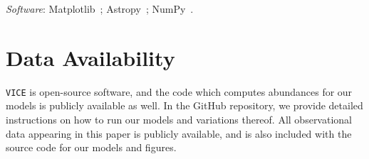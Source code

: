 \documentclass[fleqn, usenatbib]{mnras}
\begin{document}
\textit{Software}: Matplotlib~\citep{Matplotlib}; Astropy~\citep{Astropy2013, 
Astropy2018}; NumPy~\citep{NumPy}. 

\section{Data Availability} 
\label{sec:data_availability} 
\texttt{VICE} is open-source software, and the code which computes abundances 
for our models is publicly available as well. In the GitHub repository, we 
provide detailed instructions on how to run our models and variations thereof. 
All observational data appearing in this paper is publicly available, and is 
also included with the source code for our models and figures. 

\begin{appendices} 


\end{appendices}
\end{document}
